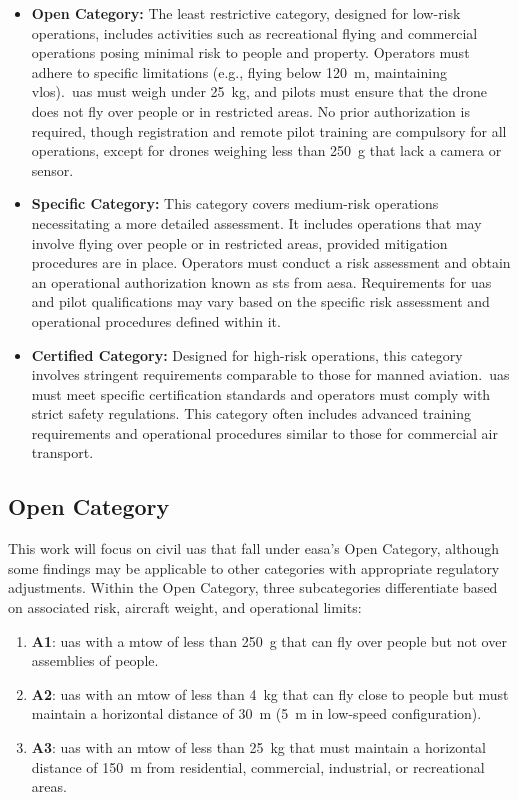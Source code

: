 \begin{itemize}
  \item \textbf{Open Category:} The least restrictive category, designed for low-risk operations, includes activities such as recreational flying and commercial operations posing minimal risk to people and property. Operators must adhere to specific limitations (e.g., flying below \SI{120}{\meter}, maintaining \gls{vlos}).\ \gls{uas} must weigh under \SI{25}{\kilogram}, and pilots must ensure that the drone does not fly over people or in restricted areas. No prior authorization is required, though registration and remote pilot training are compulsory for all operations, except for drones weighing less than \SI{250}{\gram} that lack a camera or sensor.

  \item \textbf{Specific Category:} This category covers medium-risk operations necessitating a more detailed assessment. It includes operations that may involve flying over people or in restricted areas, provided mitigation procedures are in place. Operators must conduct a risk assessment and obtain an operational authorization known as \gls{sts} from \gls{aesa}. Requirements for \gls{uas} and pilot qualifications may vary based on the specific risk assessment and operational procedures defined within it.

  \item \textbf{Certified Category:} Designed for high-risk operations, this category involves stringent requirements comparable to those for manned aviation.\ \gls{uas} must meet specific certification standards and operators must comply with strict safety regulations. This category often includes advanced training requirements and operational procedures similar to those for commercial air transport.
\end{itemize}

\subsection{Open Category}
This work will focus on civil \gls{uas} that fall under \gls{easa}'s Open Category, although some findings may be applicable to other categories with appropriate regulatory adjustments. Within the Open Category, three subcategories differentiate based on associated risk, aircraft weight, and operational limits:

\begin{enumerate}
  \item \textbf{A1}: \gls{uas} with a \gls{mtow} of less than \SI{250}{\gram} that can fly over people but not over assemblies of people.

  \item \textbf{A2}: \gls{uas} with an \gls{mtow} of less than \SI{4}{\kilogram} that can fly close to people but must maintain a horizontal distance of \SI{30}{\meter} (\SI{5}{\meter} in low-speed configuration).

  \item \textbf{A3}: \gls{uas} with an \gls{mtow} of less than \SI{25}{\kilogram} that must maintain a horizontal distance of \SI{150}{\meter} from residential, commercial, industrial, or recreational areas.
\end{enumerate}

